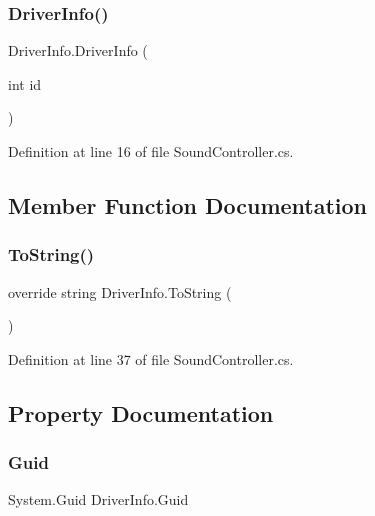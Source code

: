 \subsubsection{\texorpdfstring{Driver\+Info()}{DriverInfo()}}
{\footnotesize\ttfamily Driver\+Info.\+Driver\+Info (\begin{DoxyParamCaption}\item[{int}]{id }\end{DoxyParamCaption})}



Definition at line 16 of file Sound\+Controller.\+cs.



\subsection{Member Function Documentation}
\mbox{\label{struct_driver_info_a9e6a1cdf1ef4a71e57a7aa0c1fd7aec3}} 
\subsubsection{\texorpdfstring{To\+String()}{ToString()}}
{\footnotesize\ttfamily override string Driver\+Info.\+To\+String (\begin{DoxyParamCaption}{ }\end{DoxyParamCaption})}



Definition at line 37 of file Sound\+Controller.\+cs.



\subsection{Property Documentation}
\mbox{\label{struct_driver_info_aeeeab2b74fdfbe1123cef0ed1d931145}} 
\subsubsection{\texorpdfstring{Guid}{Guid}}
{\footnotesize\ttfamily System.\+Guid Driver\+Info.\+Guid\hspace{0.3cm}{\ttfamily [get]}}



